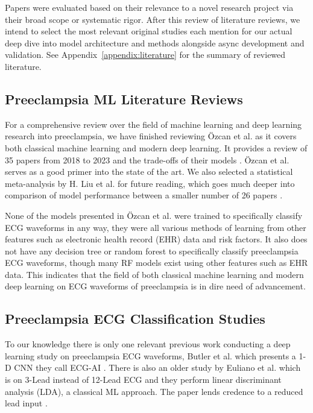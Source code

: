 \documentclass[sigconf,nonacm]{acmart}
\begin{document}
Papers were evaluated based on their relevance to a novel research project via their broad scope or systematic rigor. After this review of literature reviews, we intend to select the most relevant original studies each mention for our actual deep dive into model architecture and methods alongside async development and validation. See Appendix~\ref{appendix:literature} for the summary of reviewed literature.

\subsection{Preeclampsia ML Literature Reviews}

For a comprehensive review over the field of machine learning and deep learning research into preeclampsia, we have finished reviewing Özcan et al. as it covers both classical machine learning and modern deep learning. It provides a review of 35 papers from 2018 to 2023 and the trade-offs of their models \cite{ozcan_preeclampsia_2025}.  Özcan et al. serves as a good primer into the state of the art. We also selected a statistical meta-analysis by H. Liu et al. for future reading, which goes much deeper into comparison of model performance between a smaller number of 26 papers \cite{liu_machine_2026}.

None of the models presented in Özcan et al. were trained to specifically classify ECG waveforms in any way, they were all various methods of learning from other features such as electronic health record (EHR) data and risk factors. It also does not have any decision tree or random forest to specifically classify preeclampsia ECG waveforms, though many RF models exist using other features such as EHR data. This indicates that the field of both classical machine learning and modern deep learning on ECG waveforms of preeclampsia is in dire need of advancement.


\subsection{Preeclampsia ECG Classification Studies}
To our knowledge there is only one relevant previous work conducting a deep learning study on preeclampsia ECG waveforms, Butler et al. which presents a 1-D CNN they call ECG-AI \cite{butler_ai-based_2024}. There is also an older study by Euliano et al. which is on 3-Lead instead of 12-Lead ECG and they perform linear discriminant analysis (LDA), a classical ML approach. The paper lends credence to a reduced lead input \cite{euliano_photoplethysmography_2018}.
\end{document}

